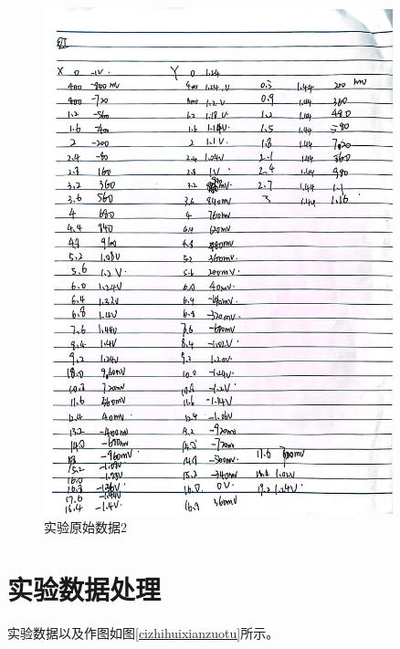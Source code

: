 \documentclass{ctexart}
\begin{document}
\begin{figure}[H]
  \centering
  \includegraphics[width=0.9\textwidth,height=0.8\textheight]{yuanshishujv2.jpg}
  \caption{实验原始数据2}
\end{figure}
\newpage


\section{实验数据处理}
实验数据以及作图如图\ref{cizhihuixianzuotu}所示。
\end{document}
